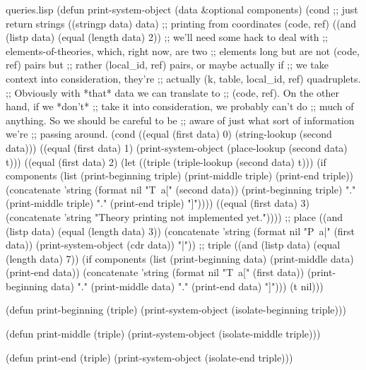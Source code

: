 \begin{common}{queries.lisp}
(defun print-system-object (data &optional components)
  (cond
    ;; just return strings
    ((stringp data)
     data)
    ;; printing from coordinates (code, ref)
    ((and (listp data)
          (equal (length data) 2))
     ;; we'll need some hack to deal with
     ;; elements-of-theories, which, right now, are two
     ;; elements long but are not (code, ref) pairs but
     ;; rather (local_id, ref) pairs, or maybe actually if
     ;; we take context into consideration, they're
     ;; actually (k, table, local_id, ref) quadruplets.
     ;; Obviously with *that* data we can translate to
     ;; (code, ref).  On the other hand, if we *don't*
     ;; take it into consideration, we probably can't do
     ;; much of anything.  So we should be careful to be
     ;; aware of just what sort of information we're
     ;; passing around.
     (cond ((equal (first data) 0)
            (string-lookup (second data)))
           ((equal (first data) 1)
            (print-system-object
             (place-lookup (second data) t)))
           ((equal (first data) 2)
            (let ((triple (triple-lookup (second data) t)))
              (if components
                  (list
                   (print-beginning triple)
                   (print-middle triple)
                   (print-end triple))
                  (concatenate
                   'string
                   (format nil "T~a[" (second data))
                   (print-beginning triple) "."
                   (print-middle triple) "."
                   (print-end triple) "]"))))
           ((equal (first data) 3)
            (concatenate 'string "Theory printing not implemented yet."))))
    ;; place
    ((and (listp data)
          (equal (length data) 3))
     (concatenate 'string
                  (format nil "P~a|" (first data))
                  (print-system-object (cdr data)) "|"))
    ;; triple
    ((and (listp data)
          (equal (length data) 7))
      (if components
          (list
           (print-beginning data)
           (print-middle data)
           (print-end data))
          (concatenate
           'string
           (format nil "T~a[" (first data))
           (print-beginning data) "."
           (print-middle data) "."
           (print-end data) "]")))
    (t nil)))

(defun print-beginning (triple)
  (print-system-object (isolate-beginning triple)))

(defun print-middle (triple)
  (print-system-object (isolate-middle triple)))

(defun print-end (triple)
  (print-system-object (isolate-end triple)))
\end{common}

